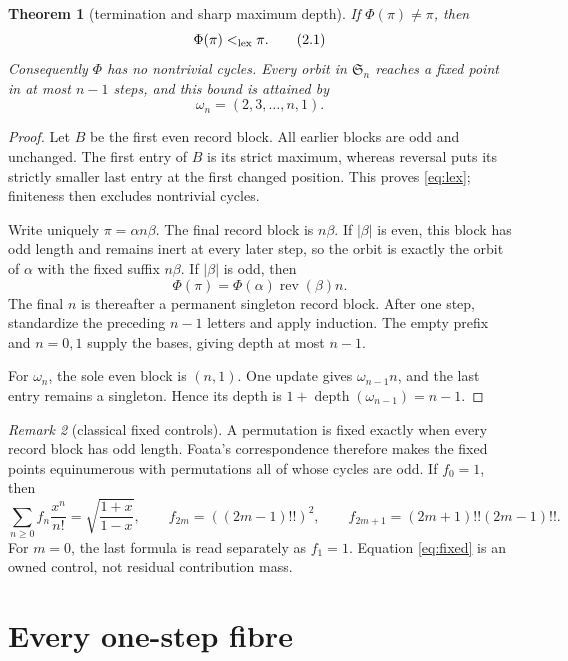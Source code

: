 \documentclass[10pt,a4paper]{amsart}
\newtheorem{theorem}{Theorem}[section]
\theoremstyle{definition}
\theoremstyle{remark}
\newtheorem{remark}[theorem]{Remark}
\newcommand{\Sn}{\mathfrak S}
\newcommand{\rev}{\operatorname{rev}}
\begin{document}
\begin{theorem}[termination and sharp maximum depth]\label{thm:clock}
If \(\Phi(\pi)\ne\pi\), then
\[
                         \Phi(\pi)<_{\rm lex}\pi.             \tag{2.1}\label{eq:lex}
\]
Consequently \(\Phi\) has no nontrivial cycles.  Every orbit in \(\Sn_n\)
reaches a fixed point in at most \(n-1\) steps, and this bound is attained by
\[
                         \omega_n=(2,3,\ldots,n,1).             \tag{2.2}
\]
\end{theorem}

\begin{proof}
Let \(B\) be the first even record block.  All earlier blocks are odd and
unchanged.  The first entry of \(B\) is its strict maximum, whereas reversal
puts its strictly smaller last entry at the first changed position.  This
proves \eqref{eq:lex}; finiteness then excludes nontrivial cycles.

Write uniquely \(\pi=\alpha n\beta\).  The final record block is
\(n\beta\).  If \(|\beta|\) is even, this block has odd length and remains
inert at every later step, so the orbit is exactly the orbit of \(\alpha\)
with the fixed suffix \(n\beta\).  If \(|\beta|\) is odd, then
\[
                  \Phi(\pi)=\Phi(\alpha)\rev(\beta)n.          \tag{2.3}
\]
The final \(n\) is thereafter a permanent singleton record block.  After
one step, standardize the preceding \(n-1\) letters and apply induction.
The empty prefix and \(n=0,1\) supply the bases, giving depth at most
\(n-1\).

For \(\omega_n\), the sole even block is \((n,1)\).  One update gives
\(\omega_{n-1}n\), and the last entry remains a singleton.  Hence its depth
is \(1+\operatorname{depth}(\omega_{n-1})=n-1\).
\end{proof}

\begin{remark}[classical fixed controls]
A permutation is fixed exactly when every record block has odd length.
Foata's correspondence therefore makes the fixed points equinumerous with
permutations all of whose cycles are odd.  If \(f_0=1\), then
\[
 \sum_{n\ge0}f_n\frac{x^n}{n!}=\sqrt{\frac{1+x}{1-x}},\qquad
 f_{2m}=((2m-1)!!)^2,\qquad
 f_{2m+1}=(2m+1)!!(2m-1)!!.                              \tag{2.4}\label{eq:fixed}
\]
For \(m=0\), the last formula is read separately as \(f_1=1\).  Equation
\eqref{eq:fixed} is an owned control, not residual contribution mass.
\end{remark}

\section{Every one-step fibre}
\end{document}
